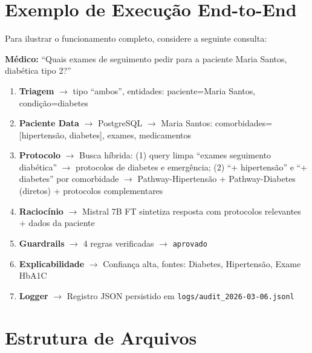 \section{Exemplo de Execução End-to-End}

Para ilustrar o funcionamento completo, considere a seguinte consulta:

\begin{warningbox}
\textbf{Médico:} ``Quais exames de seguimento pedir para a paciente Maria Santos, diabética tipo 2?''
\end{warningbox}

\begin{enumerate}
    \item \textbf{Triagem} $\rightarrow$ tipo ``ambos'', entidades: paciente=Maria Santos, condição=diabetes
    \item \textbf{Paciente Data} $\rightarrow$ PostgreSQL $\rightarrow$ Maria Santos: comorbidades=[hipertensão, diabetes], exames, medicamentos
    \item \textbf{Protocolo} $\rightarrow$ Busca híbrida: (1) query limpa ``exames seguimento diabética'' $\rightarrow$ protocolos de diabetes e emergência; (2) ``+ hipertensão'' e ``+ diabetes'' por comorbidade $\rightarrow$ Pathway-Hipertensão + Pathway-Diabetes (diretos) + protocolos complementares
    \item \textbf{Raciocínio} $\rightarrow$ Mistral 7B FT sintetiza resposta com protocolos relevantes + dados da paciente
    \item \textbf{Guardrails} $\rightarrow$ 4 regras verificadas $\rightarrow$ \texttt{aprovado}
    \item \textbf{Explicabilidade} $\rightarrow$ Confiança alta, fontes: Diabetes, Hipertensão, Exame HbA1C
    \item \textbf{Logger} $\rightarrow$ Registro JSON persistido em \texttt{logs/audit\_2026-03-06.jsonl}
\end{enumerate}

\section{Estrutura de Arquivos}

